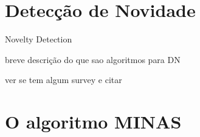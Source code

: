 






\section{Detecção de Novidade}

Novelty Detection

breve descrição do que sao algoritmos para DN

ver se tem algum survey e citar

\section{O algoritmo MINAS}

